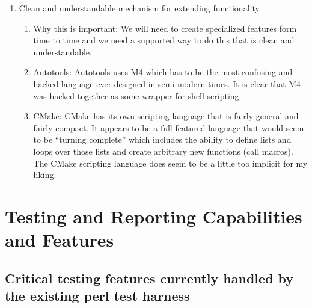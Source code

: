 \documentclass[pdf,ps2pdf,11pt]{SANDreport}
\begin{document}
\begin{enumerate}
\begin{enumerate}
  \end{enumerate}

{}\item Clean and understandable mechanism for extending
functionality

  \begin{enumerate}

  {}\item Why this is important: We will need to create specialized
  features form time to time and we need a supported way to do this
  that is clean and understandable.

  {}\item Autotools: Autotools uses M4 which has to be the most
  confusing and hacked language ever designed in semi-modern times.
  It is clear that M4 was hacked together as some wrapper for shell
  scripting.

  {}\item CMake: CMake has its own scripting language that is fairly
  general and fairly compact.  It appears to be a full featured
  language that would seem to be ``turning complete'' which includes
  the ability to define lists and loops over those lists and create
  arbitrary new functions (call macros).  The CMake scripting
  language does seem to be a little too implicit for my liking.

  \end{enumerate}

\end{enumerate}


%
\section{Testing and Reporting Capabilities and Features}
%


%
{}\subsection{Critical testing features currently handled by the
existing perl test harness}
%
\end{document}
